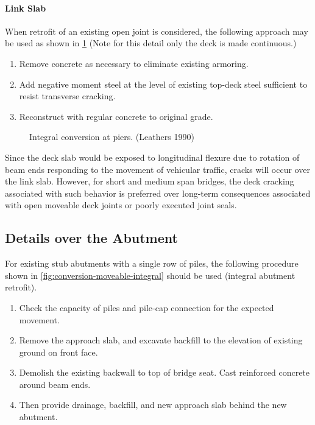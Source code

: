 \paragraph*{Link Slab}
When retrofit of an existing open joint is considered, the following approach may be used as shown in \cref{fig:integral-conversion-piers} (Note for this detail only the deck is made continuous.)
\begin{enumerate}
  \item Remove concrete as necessary to eliminate existing armoring.
  \item Add negative moment steel at the level of existing top-deck steel sufficient to resist transverse cracking.
  \item Reconstruct with regular concrete to original grade.
\end{enumerate}

\begin{figure}
  \caption{Integral conversion at piers. (Leathers 1990)}
  \label{fig:integral-conversion-piers}
\end{figure}

Since the deck slab would be exposed to longitudinal flexure due to rotation of beam ends responding to the movement of vehicular traffic, cracks will occur over the link slab. However, for short and medium span bridges, the deck cracking associated with such behavior is preferred over long-term consequences associated with open moveable deck joints or poorly executed joint seals.

\subsection{Details over the Abutment}
For existing stub abutments with a single row of piles, the following procedure shown in \cref{fig:conversion-moveable-integral} should be used (integral abutment retrofit).
\begin{enumerate}
  \item Check the capacity of piles and pile-cap connection for the expected movement.
  \item Remove the approach slab, and excavate backfill to the elevation of existing ground on front face.
  \item Demolish the existing backwall to top of bridge seat. Cast reinforced concrete around beam ends.
  \item Then provide drainage, backfill, and new approach slab behind the new abutment.
\end{enumerate}


